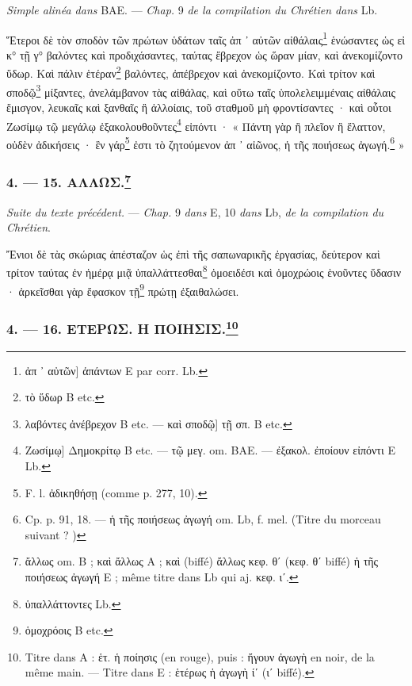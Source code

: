 \documentclass[a4paper, 11pt, oneside, polutonikogreek, french]{article}
\begin{document}
\emph{Simple alinéa dans} BAE. --- \emph{Chap.} 9 \emph{de la compilation du Chrétien dans} Lb.

\bigskip

Ἕτεροι δὲ τὸν σποδὸν τῶν πρώτων ὑδάτων ταῖς ἀπ ᾽ αὐτῶν αἰθάλαις\footnote{ἀπ ᾽ αὐτῶν] ἁπάντων E par corr. Lb.} ἑνώσαντες ὡς εἰ κ° τῇ γ° βαλόντες καὶ προδιχάσαντες, ταύτας ἔβρεχον ὡς ὥραν μίαν, καὶ ἀνεκομίζοντο ὕδωρ. Καὶ πάλιν ἑτέραν\footnote{τὸ ὕδωρ B etc.} βαλόντες, ἀπέβρεχον καὶ ἀνεκομίζοντο. Καὶ τρίτον καὶ σποδῷ\footnote{λαβόντες ἀνέβρεχον B etc. --- καὶ σποδῷ] τῇ σπ. B etc.} μίξαντες, ἀνελάμβανον τὰς αἰθάλας, καὶ οὕτω ταῖς ὑπολελειμμέναις αἰθάλαις ἔμισγον, λευκαῖς καὶ ξανθαῖς ἢ ἀλλοίαις, τοῦ σταθμοῦ μὴ φροντίσαντες · καὶ οὗτοι Ζωσίμῳ τῷ μεγάλῳ ἐξακολουθοῦντες\footnote{Ζωσίμῳ] Δημοκρίτῳ B etc. --- τῷ μεγ. om. BAE. --- ἐξακολ. ἐποίουν εἰπόντι E Lb.} εἰπόντι · « Πάντη γὰρ ἢ πλεῖον ἢ ἔλαττον, οὐδὲν ἀδικήσεις · ἓν γάρ\footnote{F. l. ἀδικηθήσῃ (comme p. 277, 10).} ἐστι τὸ ζητούμενον ἀπ ᾽ αἰῶνος, ἡ τῆς ποιήσεως ἀγωγή.\footnote{Cp. p. 91, 18. --- ἡ τῆς ποιήσεως ἀγωγή om. Lb, f. mel. (Titre du morceau suivant ? )} »

\bigskip
\centerline{\EightStarTaper}
\centerline{\EightStarTaper\EightStarTaper}
\bigskip

\subsubsection[4. --- 15. ΑΛΛΩΣ.]{4. --- 15. ΑΛΛΩΣ.\footnote{ἄλλως om. B ; καὶ ἄλλως A ; καὶ (biffé) ἄλλως κεφ. θʹ (κεφ. θʹ biffé) ἡ τῆς ποιήσεως ἀγωγή E ; même titre dans Lb qui aj. κεφ. ιʹ.}}

\emph{Suite du texte précédent.} --- \emph{Chap.} 9 \emph{dans} E, 10 \emph{dans} Lb, \emph{de la compilation du Chrétien}.

\bigskip

Ἔνιοι δὲ τὰς σκώριας ἀπέσταζον ὡς ἐπὶ τῆς σαπωναρικῆς ἐργασίας, δεύτερον καὶ τρίτον ταύτας ἐν ἡμέρᾳ μιᾷ ὑπαλλάττεσθαι\footnote{ὑπαλλάττοντες Lb.} ὁμοειδέσι καὶ ὁμοχρώοις ἑνοῦντες ὕδασιν · ἀρκεῖσθαι γὰρ ἔφασκον τῇ\footnote{ὁμοχρόοις B etc.} πρώτῃ ἐξαιθαλώσει.

\bigskip
\centerline{\EightStarTaper}
\centerline{\EightStarTaper\EightStarTaper}
\bigskip

\subsubsection[4. --- 16. ΕΤΕΡΩΣ. Η ΠΟΙΗΣΙΣ.]{4. --- 16. ΕΤΕΡΩΣ. Η ΠΟΙΗΣΙΣ.\footnote{Titre dans A : ἑτ. ἡ ποίησις (en rouge), puis : ἤγουν ἀγωγὴ en noir, de la même main. --- Titre dans E : ἑτέρως ἡ ἀγωγὴ ίʹ (ιʹ biffé).}}
\end{document}

